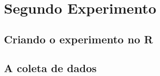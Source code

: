 \chapter{Segundo Experimento}
\label{chap:segundo_experimento}


\section{Criando o experimento no R}
\label{sec:segundo_experimento_criando o experimento_no_R}


\begin{table}[H]
  \centering
  \caption{Experimentos para teste do modelo.}
  \label{tab:experimentos_para_teste_do_modelo}
\end{table}

\section{A coleta de dados}
\label{sec:segundo_experimento_a_coleta_de_dados}

